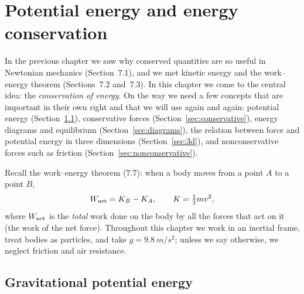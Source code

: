 \documentclass[11pt,a4paper]{article}
\begin{document}
\makenotetitle

\setcounter{section}{7}
\section{Potential energy and energy conservation}\label{sec:energy}

In the previous chapter we saw why conserved quantities are so useful in Newtonian mechanics
(Section~7.1), and we met kinetic energy and the work--energy theorem (Sections~7.2 and~7.3). In
this chapter we come to the central idea: the \emph{conservation of energy}. On the way we need a
few concepts that are important in their own right and that we will use again and again: potential
energy (Section~\ref{sec:gravpot}), conservative forces (Section~\ref{sec:conservative}), energy
diagrams and equilibrium (Section~\ref{sec:diagrams}), the relation between force and potential
energy in three dimensions (Section~\ref{sec:3d}), and nonconservative forces such as friction
(Section~\ref{sec:nonconservative}).

Recall the work--energy theorem \textup{(7.7)}: when a body moves from a point $A$ to a point $B$,
\[
  W_{\mathrm{net}} = K_B - K_A , \qquad K = \tfrac12 mv^2 ,
\]
where $W_{\mathrm{net}}$ is the \emph{total} work done on the body by all the forces that act on it (the
work of the net force). Throughout this chapter we work in an inertial frame, treat bodies as
particles, and take $g = \qty{9.8}{m/s^2}$; unless we say otherwise, we neglect friction and air
resistance.

\subsection{Gravitational potential energy}\label{sec:gravpot}
\end{document}
